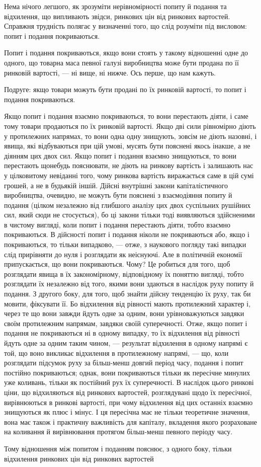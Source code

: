 Нема нічого легшого, як зрозуміти нерівномірності попиту
й подання та відхилення, що випливають звідси, ринкових цін
від ринкових вартостей. Справжня трудність полягає у визначенні
того, що слід розуміти під висловом: попит і подання
покриваються.

Попит і подання покриваються, якщо вони стоять у такому
відношенні одне до одного, що товарна маса певної галузі виробництва
може бути продана по її ринковій вартості, — ні вище,
ні нижче. Ось перше, що нам кажуть.

Подруге: якщо товари можуть бути продані по їх ринковій
вартості, то попит і подання покриваються.

Якщо попит і подання взаємно покриваються, то вони перестають
діяти, і саме тому товари продаються по їх ринковій вартості.
Якщо дві сили рівномірно діють у протилежних напрямах,
то вони одна одну знищують, зовсім не діють назовні, і явища,
які відбуваються при цій умові, мусять бути пояснені якось
інакше, а не діянням цих двох сил. Якщо попит і подання взаємно
знищуються, то вони перестають щонебудь пояснювати,
не діють на ринкову вартість і залишають нас у цілковитому
невіданні того, чому ринкова вартість виражається саме в цій
сумі грошей, а не в будьякій іншій. Дійсні внутрішні закони
капіталістичного виробництва, очевидно, не можуть бути пояснені
з взаємодіяння попиту й подання (цілком незалежно від
глибшого аналізу цих двох суспільних рушійних сил, який сюди
не стосується), бо ці закони тільки тоді виявляються здійсненими
в чистому вигляді, коли попит і подання перестають
діяти, тобто взаємно покриваються. В дійсності попит і подання
ніколи не покриваються або, якщо і покриваються, то тільки
випадково, — отже, з наукового погляду такі випадки слід прирівняти
до нуля і розглядати як неіснуючі. Але в політичній
економії припускається, що вони покриваються. Чому? Це робиться
для того, щоб розглядати явища в їх закономірному, відповідному
їх поняттю вигляді, тобто розглядати їх незалежно від
того, якими вони здаються в наслідок руху попиту й подання.
З другого боку, для того, щоб знайти дійсну тенденцію їх руху, так
би мовити, фіксувати її. Бо відхилення від рівності мають протилежний
характер і, через те що вони завжди йдуть одне за одним,
вони урівноважуються завдяки своїм протилежним напрямам, завдяки
своїй суперечності. Отже, якщо попит і подання не покриваються
ні в одному випадку, то їх відхилення від рівності йдуть одне
за одним таким чином, — результат відхилення в одному напрямі
є той, що воно викликає відхилення в протилежному напрямі, —
що, коли розглядати підсумок руху за більш-менш довгий період
часу, подання і попит постійно покриваються; однак, вони покриваються
тільки як пересічне минулих уже коливань, тільки як
постійний рух їх суперечності. В наслідок цього ринкові ціни,
що відхиляються від ринкових вартостей, розглядувані щодо
їх пересічної, вирівнюються в ринкові вартості, при чому відхилення
від цих останніх взаємно знищуються як плюс і мінус.
І ця пересічна має не тільки теоретичне значення, вона має
також і практичну важливість для капіталу, вкладення якого розраховане
на коливання й вирівнювання протягом більш-менш певного
періоду часу.

Тому відношення між попитом і поданням пояснює, з одного
боку, тільки відхилення ринкових цін від ринкових вартостей
\parbreak{}  %
